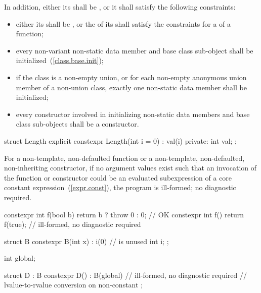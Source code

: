 In addition, either its  shall be
, or it shall satisfy the following constraints:

\begin{itemize}
\item
either its  shall be , or the  of its 
shall satisfy the constraints for a  of a
 function;

\item
every non-variant non-static data member and base class sub-object
shall be initialized~(\ref{class.base.init});

\item
if the class is a non-empty union, or for each non-empty anonymous
union member of a non-union class, exactly one non-static data member
shall be initialized;

\item
every constructor involved in initializing non-static
data members and base class sub-objects shall be a  constructor.
\end{itemize}

\enterexample
\begin{codeblock}
struct Length { 
  explicit constexpr Length(int i = 0) : val(i) { }
private: 
  int val; 
}; 
\end{codeblock}
\exitexample

\pnum
For a non-template, non-defaulted
 function or a non-template, non-defaulted, non-inheriting
 constructor, if no argument values exist such that
an invocation of the function or constructor could be an evaluated subexpression of a core
constant expression~(\ref{expr.const}), the program is ill-formed; no diagnostic
required.
\enterexample
\begin{codeblock}
constexpr int f(bool b)
  { return b ? throw 0 : 0; }               // OK
constexpr int f() { return f(true); }       // ill-formed, no diagnostic required

struct B {
  constexpr B(int x) : i(0) { }             //  is unused
  int i;
};

int global;

struct D : B {
  constexpr D() : B(global) { }             // ill-formed, no diagnostic required
                                            // lvalue-to-rvalue conversion on non-constant 
};
\end{codeblock}

